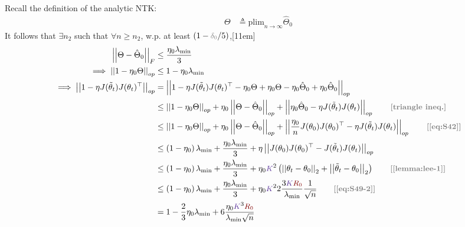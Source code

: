 \documentclass{article}
\begin{document}
\begin{appendices}
Recall the definition of the analytic NTK:
\begin{align}
	\Theta &\triangleq \text{plim}_{n \to \infty} \hat\Theta_0 
\end{align}
It follows that $\exists n_2$ such that $\forall n \geq n_2$, w.p. at least $(1 - \d/5)$,[11em]
\begin{align}
	\norm[F]{\Theta - \hat\Theta_0} 
		&\leq \frac{\eta_0 \lambda_{\text{min}}}{3} \\
	\implies 
	\norm[op]{1 - \eta_0 \Theta} 
		&\leq 1 - \eta_0 \lambda_{\text{min}} \\
	\implies 
	\norm[op]{1 - \eta J(\tilde\theta_t) J(\theta_t)^\top} 
		&= \norm[op]{1 - \eta J(\tilde\theta_t) J(\theta_t)^\top  - \eta_0 \Theta + \eta_0 \Theta - \eta_0 \hat\Theta_0+ \eta_0 \hat\Theta_0   } \\
		&\leq \norm[op]{1 - \eta_0 \Theta} 
			+ \eta_0 \norm[op]{\Theta - \hat\Theta_0} 
			+ \norm[op]{\eta_0 \hat\Theta_0 - \eta J(\tilde \theta_t) J(\theta_t)} 
			\qquad \mtgray{[triangle ineq.]} \\
		&\leq \norm[op]{1 - \eta_0 \Theta} 
		+ \eta_0 \norm[op]{\Theta - \hat\Theta_0} 
		+ \norm[op]{\frac{\eta_0}{n} J(\theta_0) J(\theta_0)^\top - \eta J(\tilde \theta_t) J(\theta_t)} 
		\qquad \mtgray{[\ref{eq:S42}]} \\ 
		&\leq \lr{1 - \eta_0} \lambda_{\text{min}} +  \frac{\eta_0 \lambda_{\text{min}}}{3}
			+ \eta \norm[op]{J(\theta_0) J(\theta_0)^\top - J(\tilde \theta_t) J(\theta_t)}  \\
		&\leq 
			 \lr{1 - \eta_0} \lambda_{\text{min}} +  \frac{\eta_0 \lambda_{\text{min}}}{3}
			+	 \eta_0 \k^2 \lr{ \norm{\theta_t - \theta_0} + \norm{\tilde\theta_t - \theta_0} }
			\qquad \mtgray{[\ref{lemma:lee-1}]} \\
		&\leq 
		 	\lr{1 - \eta_0} \lambda_{\text{min}} +  \frac{\eta_0 \lambda_{\text{min}}}{3}
			+\eta_0 \k^2 2 \frac{3 \k \r}{\lambda_{\text{min}}} \inv{\sqrt{n}}
			\qquad \mtgray{[\ref{eq:S49-2}]} \\
		&= 1 - \frac{2}{3} \eta_0 \lambda_{\text{min}} + 6 \frac{\eta_0 \k^3 \r}{\lambda_{\text{min}} \sqrt{n}}
\end{align}


\end{appendices}
\end{document}
